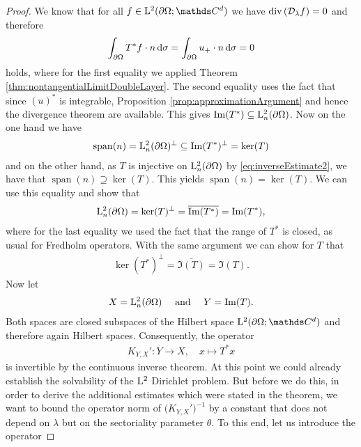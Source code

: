 \begin{proof}
  We know that for all $f \in \Ell^2(\partial\Omega; \C^d)$ we have $\mathrm{div\,} (\mathcal{D}_\lambda f) = 0$ and therefore 
  \begin{align*}
    \int_{\partial\Omega} T^* f \cdot n \, {\operatorname{d}\!{\sigma}} =\int_{\partial\Omega} u_+ \cdot n \, {\operatorname{d}\!{\sigma}} =  0 
  \end{align*}
  holds, where for the first equality we applied Theorem \ref{thm:nontangentialLimitDoubleLayer}. The second equality uses the fact that since $(u)^*$ is integrable, Proposition \ref{prop:approximationArgument} and hence the divergence theorem are available.
  This gives $\operatorname{Im}(T^*) \subseteq \mathrm{L}_n^2(\partial\Omega)$.
  Now on the one hand we have
  \begin{align*}
    \operatorname{span}(n)
    = \mathrm{L}_n^2(\partial\Omega)^\perp
    \subseteq \operatorname{Im}(T^*)^\perp
    = \ker(T)
  \end{align*}
  and on the other hand, as $T$ is injective on $\mathrm{L}^2_n(\partial\Omega)$ by \eqref{eq:inverseEstimate2}, we have that $ \operatorname{span}(n) \supseteq \ker(T)$.
  This yields $\operatorname{span}(n) = \ker(T)$.
  We can use this equality and show that
  \begin{align*}
    \mathrm{L}^2_n(\partial\Omega) = \ker(T)^\perp = \overline{\operatorname{Im}(T^*)} = \operatorname{Im}(T^*),
  \end{align*}
  where for the last equality we used the fact that the range of $T^*$ is closed, as usual for Fredholm operators.
  With the same argument we can show for $T$ that
  \begin{align*}
    \ker(T^*)^\perp = \overline{\Im(T)} = \Im(T).
  \end{align*}
  Now let 
  \begin{align*}
    X = \mathrm{L}^2_n(\partial\Omega)\quad\text{ and }\quad Y = \operatorname{Im}(T).
  \end{align*}
  Both spaces are closed subspaces of the Hilbert space $\Ell^2(\partial\Omega; \C^d)$ and therefore again Hilbert spaces.
  Consequently, the operator
  \begin{align*}
    K_{Y,X}' \colon Y \to X, \quad x \mapsto T^* x
  \end{align*}
  is invertible by the continuous inverse theorem.
  At this point we could already establish the solvability of the $\mathrm{L}^2$ Dirichlet problem.
  But before we do this, in order to derive the additional estimates which were stated in the theorem, we want to bound the operator norm of $\big(K_{Y,X}'\big)^{-1}$ by a constant that does not depend on $\lambda$ but on the sectoriality parameter $\theta$.
  To this end, let us introduce the operator

\end{proof}
